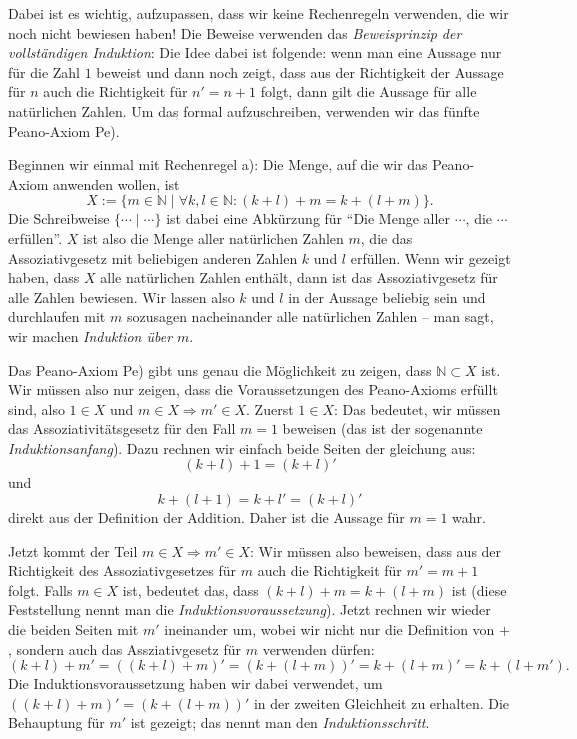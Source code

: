 \documentclass{zusammenfassung}
\begin{document}
Dabei ist es wichtig, aufzupassen, dass wir keine Rechenregeln verwenden, die wir noch nicht bewiesen haben! Die Beweise verwenden
das \emph{Beweisprinzip der vollständigen Induktion}: Die Idee dabei ist folgende: wenn man eine Aussage nur für die Zahl $1$ 
beweist und dann noch zeigt, dass aus der Richtigkeit der Aussage für $n$ auch die Richtigkeit für $n'=n+1$ folgt, dann gilt die
Aussage für alle natürlichen Zahlen. Um das formal aufzuschreiben, verwenden wir das fünfte Peano-Axiom Pe). 

Beginnen wir einmal mit Rechenregel a): Die Menge, auf die wir das Peano-Axiom anwenden wollen, ist
\[
	X:=\{m\in\mathbb N\mid\forall k,l\in\mathbb N:(k+l)+m=k+(l+m)\}.
\]
Die Schreibweise $\{\cdots\mid\cdots\}$ ist dabei eine Abkürzung für "`Die Menge aller $\cdots$, die $\cdots$ erfüllen"'. $X$ ist
also die Menge aller natürlichen Zahlen $m$, die das Assoziativgesetz mit beliebigen anderen Zahlen $k$ und $l$ erfüllen. Wenn wir
gezeigt haben, dass $X$ alle natürlichen Zahlen enthält, dann ist das Assoziativgesetz für alle Zahlen bewiesen. Wir lassen also
$k$ und $l$ in der Aussage beliebig sein und durchlaufen mit $m$ sozusagen nacheinander alle natürlichen Zahlen -- man sagt, wir
machen \emph{Induktion über $m$}.

Das Peano-Axiom Pe) gibt uns genau die Möglichkeit zu zeigen, dass $\mathbb N\subset X$ ist. Wir müssen also nur zeigen, dass die
Voraussetzungen des Peano-Axioms erfüllt sind, also $1\in X$ und $m\in X\Rightarrow m'\in X$. Zuerst $1\in X$: Das bedeutet, wir
müssen das Assoziativitätsgesetz für den Fall $m=1$ beweisen (das ist der sogenannte \emph{Induktionsanfang}). Dazu rechnen wir
einfach beide Seiten der gleichung aus:
\[
	(k+l)+1=(k+l)'
\]
und
\[
	k+(l+1)=k+l'=(k+l)'
\]
direkt aus der Definition der Addition. Daher ist die Aussage für $m=1$ wahr.

Jetzt kommt der Teil $m\in X\Rightarrow m'\in X$: Wir müssen also beweisen, dass aus der Richtigkeit des Assoziativgesetzes für
$m$ auch die Richtigkeit für $m'=m+1$ folgt. Falls $m\in X$ ist, bedeutet das, dass $(k+l)+m=k+(l+m)$ ist (diese Feststellung
nennt man die \emph{Induktionsvoraussetzung}). Jetzt rechnen wir wieder die beiden Seiten mit $m'$ ineinander um, wobei wir nicht 
nur die Definition von $+$, sondern auch das Assziativgesetz für $m$ verwenden dürfen:
\[
	(k+l)+m'=((k+l)+m)'=(k+(l+m))'=k+(l+m)'=k+(l+m').
\]
Die Induktionsvoraussetzung haben wir dabei verwendet, um $((k+l)+m)'=(k+(l+m))'$ in der zweiten Gleichheit zu erhalten. Die
Behauptung für $m'$ ist gezeigt; das nennt man den \emph{Induktionsschritt}.
\end{document}

